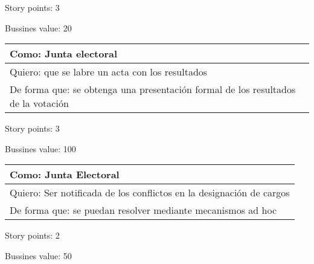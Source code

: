 \medskip
Story points: 3

\medskip
Bussines value: 20


\bigskip

\begin{tabular}{|l|}
\hline
Como: Junta electoral\\
\hline
Quiero: que se labre un acta con los resultados\\
\hline
De forma que: se obtenga una presentaci\'on formal de los resultados de la votaci\'on \\
\hline
\end{tabular}

\medskip
Story points: 3

\medskip
Bussines value: 100


\bigskip

\begin{tabular}{|l|}
\hline
Como: Junta Electoral\\
\hline
Quiero: Ser notificada de los conflictos en la designaci\'on de cargos\\
\hline
De forma que: se puedan resolver mediante mecanismos ad hoc \\
\hline
\end{tabular}

\medskip
Story points: 2

\medskip
Bussines value: 50
